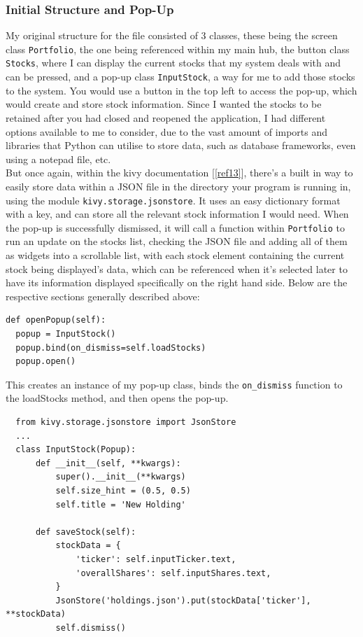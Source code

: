 \documentclass{article}
\begin{document}
\subsubsection{Initial Structure and Pop-Up}
My original structure for the file consisted of 3 classes, these being the screen class \texttt{{Portfolio}}, the one being referenced within my main hub, the button class \texttt{Stocks}, where I can display the current stocks that my system deals with and can be pressed, and a pop-up class \texttt{InputStock}, a way for me to add those stocks to the system. You would use a button in the top left to access the pop-up, which would create and store stock information. Since I wanted the stocks to be retained after you had closed and reopened the application, I had different options available to me to consider, due to the vast amount of imports and libraries that Python can utilise to store data, such as database frameworks, even using a notepad file, etc.\\\vspace{0.3cm}
But once again, within the kivy documentation [\ref{ref13}], there's a built in way to easily store data within a JSON file in the directory your program is running in, using the module \texttt{kivy.storage.jsonstore}. It uses an easy dictionary format with a key, and can store all the relevant stock information I would need. When the pop-up is successfully dismissed, it will call a function within \texttt{Portfolio} to run an update on the stocks list, checking the JSON file and adding all of them as widgets into a scrollable list, with each stock element containing the current stock being displayed's data, which can be referenced when it's selected later to have its information displayed specifically on the right hand side. Below are the respective sections generally described above: \\\vspace{0.3cm}

\begin{verbatim}def openPopup(self):
  popup = InputStock()
  popup.bind(on_dismiss=self.loadStocks)
  popup.open()
\end{verbatim}

\vspace{0.3cm}
This creates an instance of my pop-up class, binds the \texttt{on\_dismiss} function to the loadStocks method, and then opens the pop-up.\\\vspace{0.3cm}

\begin{verbatim}
  from kivy.storage.jsonstore import JsonStore
  ...
  class InputStock(Popup):
      def __init__(self, **kwargs):
          super().__init__(**kwargs)
          self.size_hint = (0.5, 0.5)
          self.title = 'New Holding'

      def saveStock(self):
          stockData = {
              'ticker': self.inputTicker.text,
              'overallShares': self.inputShares.text,
          }
          JsonStore('holdings.json').put(stockData['ticker'], **stockData)
          self.dismiss()
\end{verbatim}
\end{document}
